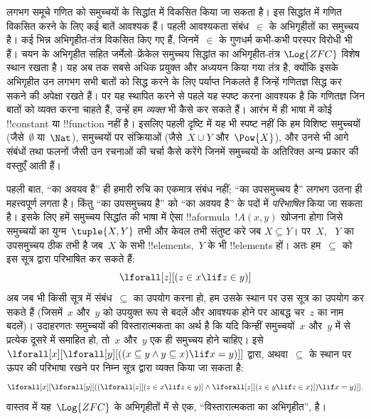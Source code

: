 \documentclass[../../../include/open-logic-section]{subfiles}
\begin{document}


लगभग समूचे गणित को समुच्चयों के सिद्धांत में विकसित किया जा सकता है। इस
सिद्धांत में गणित विकसित करने के लिए कई बातें आवश्यक हैं। पहली आवश्यकता
संबंध~$\in$ के अभिगृहीतों का समुच्चय है। कई भिन्न अभिगृहीत-तंत्र विकसित किए
गए हैं, जिनमें~$\in$ के गुणधर्म कभी-कभी परस्पर विरोधी भी हैं। चयन के
अभिगृहीत सहित जर्मेलो--फ्रेंकेल समुच्चय सिद्धांत का अभिगृहीत-तंत्र
$\Log{ZFC}$ विशेष स्थान रखता है। यह अब तक सबसे अधिक प्रयुक्त और अध्ययन किया
गया तंत्र है, क्योंकि इसके अभिगृहीत उन लगभग सभी बातों को सिद्ध करने के लिए
पर्याप्त निकलते हैं जिन्हें गणितज्ञ सिद्ध कर सकने की अपेक्षा रखते हैं। पर यह
स्थापित करने से पहले यह स्पष्ट करना आवश्यक है कि गणितज्ञ जिन बातों को व्यक्त
करना चाहते हैं, उन्हें हम \emph{व्यक्त} भी कैसे कर सकते हैं। आरंभ में ही
भाषा में कोई !!{constant} या !!{function} नहीं है। इसलिए पहली दृष्टि में यह
भी स्पष्ट नहीं कि हम विशिष्ट समुच्चयों (जैसे~$\emptyset$ या~$\Nat$),
समुच्चयों पर संक्रियाओं (जैसे~$X \cup Y$ और~$\Pow{X}$), और उनसे भी आगे
संबंधों तथा फलनों जैसी उन रचनाओं की चर्चा कैसे करेंगे जिनमें समुच्चयों के
अतिरिक्त अन्य प्रकार की वस्तुएँ आती हैं।

पहली बात, ``का अवयव है'' ही हमारी रुचि का एकमात्र संबंध नहीं; ``का उपसमुच्चय
है'' लगभग उतना ही महत्त्वपूर्ण लगता है। किंतु ``का उपसमुच्चय है'' को ``का
अवयव है'' के पदों में \emph{परिभाषित} किया जा सकता है। इसके लिए हमें समुच्चय
सिद्धांत की भाषा में ऐसा !!a{formula}~$!A(x, y)$ खोजना होगा जिसे समुच्चयों का
युग्म~$\tuple{X, Y}$ तभी और केवल तभी संतुष्ट करे जब $X \subseteq Y$। पर~$X$,
~$Y$ का उपसमुच्चय ठीक तभी है जब~$X$ के सभी !!{element}s,~$Y$ के भी
!!{element}s हों। अतः हम~$\subseteq$ को इस सूत्र द्वारा परिभाषित कर सकते हैं:
\[
\lforall[z][(z \in x \lif z \in y)]
\]
अब जब भी किसी सूत्र में संबंध~$\subseteq$ का उपयोग करना हो, हम उसके स्थान पर
उस सूत्र का उपयोग कर सकते हैं (जिसमें~$x$ और~$y$ को उपयुक्त रूप से बदलें और
आवश्यक होने पर आबद्ध चर~$z$ का नाम बदलें)। उदाहरणतः समुच्चयों की
विस्तारात्मकता का अर्थ है कि यदि किन्हीं समुच्चयों~$x$ और~$y$ में से प्रत्येक
दूसरे में समाहित हो, तो~$x$ और~$y$ एक ही समुच्चय होने चाहिए। इसे
$\lforall[x][\lforall[y][((x \subseteq y \land y
    \subseteq x) \lif x = y)]]$ द्वारा, अथवा~$\subseteq$ के स्थान पर ऊपर की परिभाषा रखने पर निम्न
सूत्र द्वारा व्यक्त किया जा सकता है:
\[
\lforall[x][\lforall[y][((\lforall[z][(z \in x \lif z \in y)] \land
    \lforall[z][(z \in y \lif z \in x)]) \lif x = y)]].
\]
वास्तव में यह~$\Log{ZFC}$ के अभिगृहीतों में से एक, ``विस्तारात्मकता का
अभिगृहीत'', है।
\end{document}
